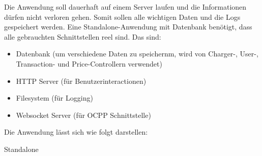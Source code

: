 Die Anwendung soll dauerhaft auf einem Server laufen und die Informationen dürfen nicht verloren gehen.
Somit sollen alle wichtigen Daten und die Logs gespeichert werden. 
Eine Standalone-Anwendung mit Datenbank benötigt, dass alle gebrauchten Schnittstellen reel sind. Das sind:
\begin{itemize}
    \item Datenbank (um verschiedene Daten zu speichernm, wird von Charger-, User-, Transaction- und Price-Controllern verwendet)
    \item HTTP Server (für Benutzerinteractionen)
    \item Filesystem (für Logging)
    \item Websocket Server (für OCPP Schnittstelle)
\end{itemize}
Die Anwendung lässt sich wie folgt darstellen:

{Standalone}